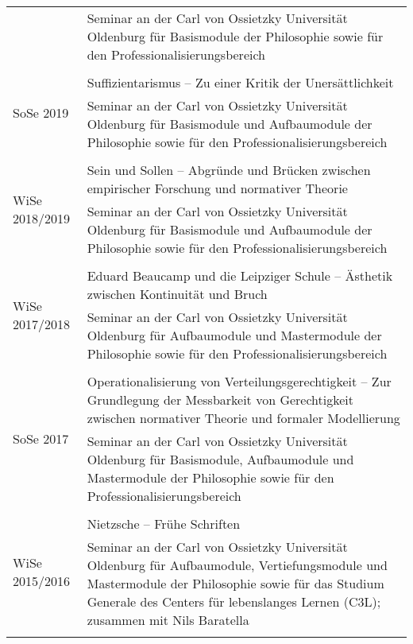 \documentclass[a4paper,10pt]{article}
\begin{document}
\begin{longtable}{p{2cm}p{}}
& \footnotesize{Seminar an der Carl von Ossietzky Universität Oldenburg für Basismodule der Philosophie sowie für den Professionalisierungsbereich}\\
\\
\multirow{2}{2cm}{\footnotesize{SoSe 2019}} & Suffizientarismus -- Zu einer Kritik der Unersättlichkeit\\
& \footnotesize{Seminar an der Carl von Ossietzky Universität Oldenburg für Basismodule und Aufbaumodule der Philosophie sowie für den Professionalisierungsbereich}\\
\\
\multirow{2}{2cm}{\footnotesize{WiSe 2018/2019}} & Sein und Sollen -- Abgründe und Brücken zwischen empirischer Forschung und normativer Theorie\\
& \footnotesize{Seminar an der Carl von Ossietzky Universität Oldenburg für Basismodule und Aufbaumodule der Philosophie sowie für den Professionalisierungsbereich}\\
\\
\multirow{2}{2cm}{\footnotesize{WiSe 2017/2018}} & Eduard Beaucamp und die Leipziger Schule -- Ästhetik zwischen Kontinuität und Bruch\\
& \footnotesize{Seminar an der Carl von Ossietzky Universität Oldenburg für Aufbaumodule und Mastermodule der Philosophie sowie für den Professionalisierungsbereich}\\
\\
\multirow{2}{2cm}{\footnotesize{SoSe 2017}} & Operationalisierung von Verteilungsgerechtigkeit -- Zur Grundlegung der Messbarkeit von Gerechtigkeit zwischen normativer Theorie und formaler Modellierung\\
& \footnotesize{Seminar an der Carl von Ossietzky Universität Oldenburg für Basismodule, Aufbaumodule und Mastermodule der Philosophie sowie für den Professionalisierungsbereich}\\
\\
\multirow{2}{2cm}{\footnotesize{WiSe 2015/2016}} & Nietzsche -- Frühe Schriften\\
& \footnotesize{Seminar an der Carl von Ossietzky Universität Oldenburg für Aufbaumodule, Vertiefungsmodule und Mastermodule der Philosophie sowie für das Studium Generale des Centers für lebenslanges Lernen (C3L); zusammen mit Nils Baratella}\\
\\
\end{longtable}
\end{document}
